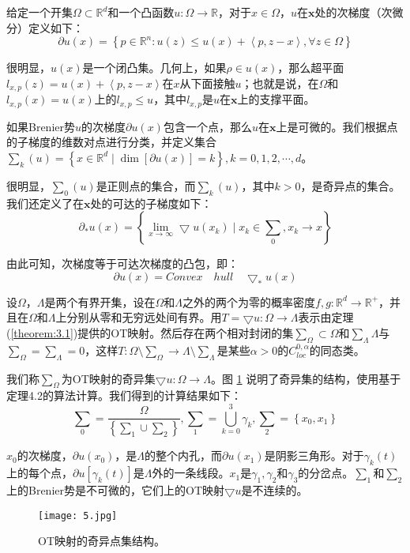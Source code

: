 \begin{definition}[次梯度]\label{definition:3.7}
	给定一个开集$\Omega \subset \mathbb{R}^d$和一个凸函数$u: \Omega \to \mathbb{R}$，对于$x \in \Omega$，$u$在$\mathbf{x}$处的次梯度（次微分）定义如下：
	\begin{equation*}
		\partial u(x)=\left \{ p \in \mathbb{R}^n : u(z) \le u(x) + \left \langle p,z-x \right \rangle , \forall z \in \Omega \right \}    
	\end{equation*}
	
	很明显，$u(x)$是一个闭凸集。几何上，如果$\rho \in u(x)$，那么超平面$l_{x,p}(z)=u(x)+\left \langle p,z-x \right \rangle $在$x$从下面接触$u$；也就是说，在$\Omega$和$l_{x,p}(x)=u(x)$上的$l_{x,p} \le u$，其中$l_{x,p}$是$u$在$\mathbf{x}$上的支撑平面。
	
	如果Brenier势$u$的次梯度$\partial u(x)$包含一个点，那么$u$在$\mathbf{x}$上是可微的。我们根据点的子梯度的维数对点进行分类，并定义集合 $\sum _k (u) =\left \{ x \in \mathbb{R}^d \mid \dim \left [ \partial u(x) \right ] =k  \right \} ,k=0,1,2,\cdots ,d$。
	
	很明显，$\sum _0(u)$是正则点的集合，而$\sum _k(u)$，其中$k>0$，是奇异点的集合。我们还定义了在$\mathbf{x}$处的可达的子梯度如下：
	\begin{equation*}
		\partial _* u(x)=\left \{ \lim_{x \to \infty} \bigtriangledown u(x_k) \mid x_k \in \sum _0, x_k \to x \right \}    
	\end{equation*}

	由此可知，次梯度等于可达次梯度的凸包，即：
	\begin{equation*}
		\partial u(x)=Convex \quad hull \quad \bigtriangledown _* u(x)
	\end{equation*}
\end{definition}

\begin{theorem}[正则性]\label{theorem:3.5}
	设$\Omega$，$\Lambda$是两个有界开集，设在$\Omega$和$\Lambda$之外的两个为零的概率密度$f,g : \mathbb{R}^d \to \mathbb{R} ^+$，并且在$\Omega$和$\Lambda$上分别从零和无穷远处间有界。用$T=\bigtriangledown u: \Omega \to \Lambda$表示由定理(\ref{theorem:3.1})提供的OT映射。然后存在两个相对封闭的集$\sum _{\Omega} \subset \Omega$和$\sum _{\Lambda} \Lambda$与$\sum _{\Omega} = \sum _{\Lambda} =0$，这样$T: \Omega \setminus \sum _{\Omega} \to \Lambda \setminus \sum _{\Lambda}$是某些$\alpha > 0$的$C_{loc}^{0,\alpha}$的同态类。
	
	我们称$\sum_{\Omega}$为OT映射的奇异集$\bigtriangledown u : \Omega \to \Lambda$。图 \ref{fig:5} 说明了奇异集的结构，使用基于定理4.2的算法计算。我们得到的计算结果如下：
	\begin{equation*}
		\sum _0 = \frac{\Omega}{\left \{ \sum _1 \cup \sum _2 \right \}} , \sum _1=\bigcup_{k=0}^{3} \gamma _k, \sum _2=\left \{ x_0,x_1 \right \}    
	\end{equation*}
	
	$x_0$的次梯度，$\partial u(x_0)$，是$\Lambda$的整个内孔，而$\partial u(x_1)$是阴影三角形。对于$\gamma _k (t)$上的每个点，$\partial u \left [ \gamma_k(t) \right ]$是$\Lambda$外的一条线段。$x_1$是$\gamma_1,\gamma_2$和$\gamma_3$的分岔点。$\sum_1$和$\sum_2$上的Brenier势是不可微的，它们上的OT映射$\bigtriangledown u$是不连续的。
\end{theorem}

\begin{figure}[h]
	\centering
	\texttt{[image: 5.jpg]}
	\caption{OT映射的奇异点集结构。}
	\label{fig:5}
\end{figure}